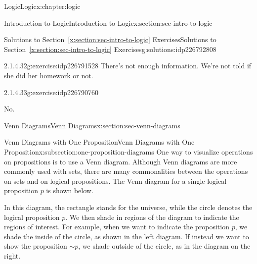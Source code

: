 \documentclass[twoside,10pt,]{book}
\newcommand{\xreffont}{\relax}
\numberwithin{equation}{section}
\begin{document}
\begin{chapterptx}{Logic}{}{Logic}{}{}{x:chapter:logic}
\begin{sectionptx}{Introduction to Logic}{}{Introduction to Logic}{}{}{x:section:sec-intro-to-logic}
\begin{solutions-subsection}{Solutions to Section~{\xreffont\ref*{x:section:sec-intro-to-logic}} Exercises}{}{Solutions to Section~{\xreffont\ref*{x:section:sec-intro-to-logic}} Exercises}{}{}{g:solutions:idp226792808}
\begin{exercisegroup}
\begin{divisionsolutioneg}{2.1.4.32}{}{g:exercise:idp226791528}
\noindent\hypertarget{g:solution:idp226786024-main}{}There's not enough information.  We're not told if she did her homework or not.\end{divisionsolutioneg}%
\begin{divisionsolutioneg}{2.1.4.33}{}{g:exercise:idp226790760}%
\par\smallskip%
\noindent\hypertarget{g:solution:idp226791912-main}{}No.\end{divisionsolutioneg}%
\end{exercisegroup}
\par\medskip\noindent
\end{solutions-subsection}
\end{sectionptx}
%
%
\typeout{************************************************}
\typeout{************************************************}
%
\begin{sectionptx}{Venn Diagrams}{}{Venn Diagrams}{}{}{x:section:sec-venn-diagrams}
%
%
\typeout{************************************************}
\typeout{************************************************}
%
\begin{subsectionptx}{Venn Diagrams with One Proposition}{}{Venn Diagrams with One Proposition}{}{}{x:subsection:one-proposition-diagrams}
One way to visualize operations on propositions is to use a Venn diagram.  Although Venn diagrams are more commonly used with sets, there are many commonalities between the operations on sets and on logical propositions.  The Venn diagram for a single logical proposition \(p\) is shown below.%
\par
\begin{image}{0.3}{0.4}{0.3}%
%
\end{image}%
%
\par
In this diagram, the rectangle stands for the universe, while the circle denotes the logical proposition \(p\).  We then shade in regions of the diagram to indicate the regions of interest.  For example, when we want to indicate the proposition \(p\), we shade the inside of the circle, as shown in the left diagram.  If instead we want to show the proposition \(\sim\!{p}\), we shade outside of the circle, as in the diagram on the right.%
\par

\end{subsectionptx}
\end{sectionptx}
\end{chapterptx}
\end{document}
